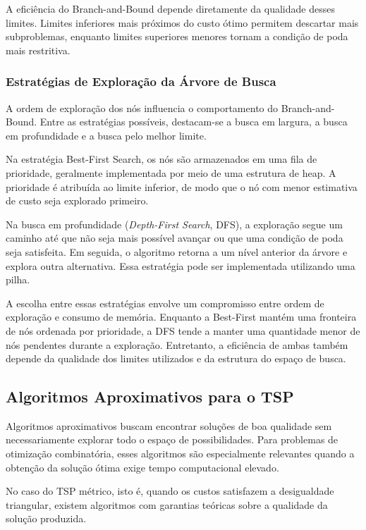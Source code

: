 \documentclass[12pt]{article}
\begin{document}
A eficiência do Branch-and-Bound depende diretamente da qualidade
desses limites. Limites inferiores mais próximos do custo ótimo permitem
descartar mais subproblemas, enquanto limites superiores menores tornam
a condição de poda mais restritiva.

\subsubsection{Estratégias de Exploração da Árvore de Busca}

A ordem de exploração dos nós influencia o comportamento do
Branch-and-Bound. Entre as estratégias possíveis, destacam-se a busca
em largura, a busca em profundidade e a busca pelo melhor limite.

Na estratégia Best-First Search, os nós são armazenados em uma fila
de prioridade, geralmente implementada por meio de uma estrutura de
heap. A prioridade é atribuída ao limite inferior, de modo que o nó
com menor estimativa de custo seja explorado primeiro.

Na busca em profundidade (\textit{Depth-First Search}, DFS), a
exploração segue um caminho até que não seja mais possível avançar
ou que uma condição de poda seja satisfeita. Em seguida, o algoritmo
retorna a um nível anterior da árvore e explora outra alternativa.
Essa estratégia pode ser implementada utilizando uma pilha.

A escolha entre essas estratégias envolve um compromisso entre ordem
de exploração e consumo de memória. Enquanto a Best-First mantém uma
fronteira de nós ordenada por prioridade, a DFS tende a manter uma
quantidade menor de nós pendentes durante a exploração. Entretanto,
a eficiência de ambas também depende da qualidade dos limites
utilizados e da estrutura do espaço de busca.

\subsection{Algoritmos Aproximativos para o TSP}

Algoritmos aproximativos buscam encontrar soluções de boa qualidade
sem necessariamente explorar todo o espaço de possibilidades. Para
problemas de otimização combinatória, esses algoritmos são especialmente
relevantes quando a obtenção da solução ótima exige tempo computacional
elevado.

No caso do TSP métrico, isto é, quando os custos satisfazem a desigualdade
triangular, existem algoritmos com garantias teóricas sobre a qualidade
da solução produzida.
\end{document}
